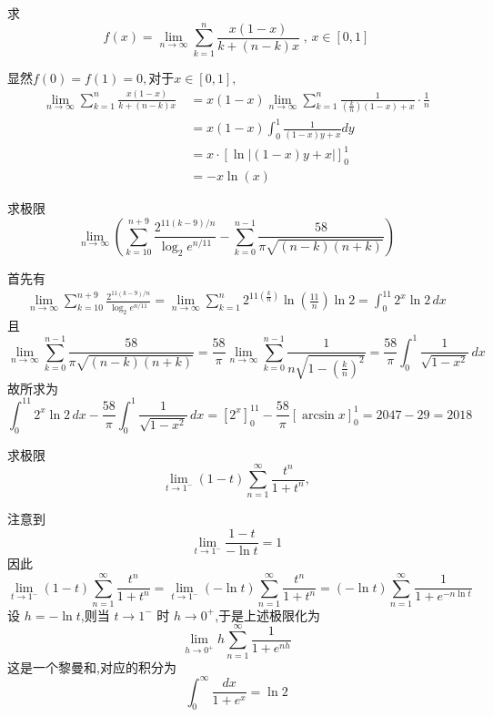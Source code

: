 \begin{questions}
    \question 求
    \[
    f(x)=\lim_{n\to\infty}\sum_{k=1}^{n} 
    \frac{x(1-x)}{k+(n-k)x}\;,\,x\in[0,1]
    \]
    \begin{solution} 
    显然$f(0)=f(1)=0,$对于$x \in [0,1],$
        \begin{align*} 
        \lim_{n\to\infty}\sum_{k=1}^{n} 
        \frac{x(1-x)}{k+(n-k)x}\
        &=x(1-x)\lim_{n\to\infty}\sum_{k=1}^{n} 
        \frac{1}{(\frac{k}{n})(1-x)+x}\cdot\frac{1}{n}\\ 
        &=x(1-x)\int_0^1 \frac{1}{(1-x)y+x}dy\\ 
        &=x\cdot\left[\ln|(1-x)y+x|\right]_0^1\\ 
        &=-x\ln(x) 
        \end{align*}
    \end{solution}

    \question 求极限
    \[
    \lim_{n\to\infty} \left( \sum_{k=10}^{n+9} \frac{2^{11(k-9)/n}}{\log_2 e^{n/11}} - \sum_{k=0}^{n-1} \frac{58}{\pi \sqrt{(n-k)(n+k)}} \right)
    \]
    \begin{solution}
        首先有
        \begin{align*}
        \lim_{n\to\infty} \sum_{k=10}^{n+9} \frac{2^{11(k-9)/n}}{\log_2 e^{n/11}}
        = \lim_{n \to \infty} \sum_{k=1}^{n} 2^{11(\frac{k}{n})} \ln\left(\frac{11}{n}\right) \ln 2
        =\int_{0}^{11} 2^{x} \ln 2\, dx
        \end{align*}
        且
        \[
        \lim_{n\to\infty} \sum_{k=0}^{n-1} \frac{58}{\pi \sqrt{(n-k)(n+k)}}
        = \frac{58}{\pi} \lim_{n\to\infty} \sum_{k=0}^{n-1} \frac{1}{n\sqrt{1 - (\frac{k}{n})^2}}
        = \frac{58}{\pi} \int_{0}^{1} \frac{1}{\sqrt{1-x^2}} \, dx
        \]
        故所求为
        \[
        \int_{0}^{11} 2^{x} \ln 2\, dx-\frac{58}{\pi}\int_{0}^{1} \frac{1}{\sqrt{1-x^2}} \, dx=\left[2^{x} \right]_{0}^{11}-\frac{58}{\pi}\left[ \arcsin x \right]_{0}^{1}=2047-29=2018
        \]
    \end{solution}

    \question 求极限
    \[
    \lim_{t\to 1^-}(1-t)\sum_{n=1}^{\infty}\frac{t^n}{1+t^n},
    \]
    \begin{solution}
        注意到
        \[
        \lim_{t\to 1^-}\frac{1-t}{-\ln t}=1
        \]
        因此
        \[
        \lim_{t\to 1^-}(1-t)\sum_{n=1}^{\infty}\frac{t^n}{1+t^n}
        =\lim_{t\to 1^-}(-\ln t)\sum_{n=1}^{\infty}\frac{t^n}{1+t^n}
        =(-\ln t)\sum_{n=1}^{\infty}\frac{1}{1+e^{-n\ln t}}
        \]
        设 $h=-\ln t$,则当 $t\to 1^-$ 时 $h\to 0^+$,于是上述极限化为
        \[
        \lim_{h\to 0^+}h\sum_{n=1}^{\infty}\frac{1}{1+e^{nh}}
        \]
        这是一个黎曼和,对应的积分为
        \[
        \int_0^{\infty}\frac{dx}{1+e^x}=\ln 2
        \]
    \end{solution}


\end{questions}

